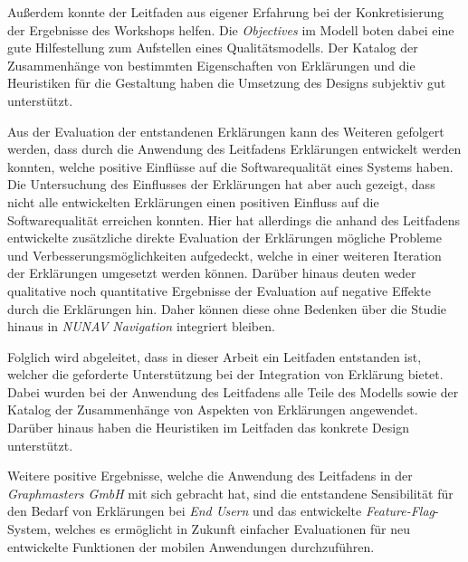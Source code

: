 Außerdem konnte der Leitfaden aus eigener Erfahrung bei der Konkretisierung der Ergebnisse des Workshops helfen. Die \textit{Objectives} im Modell boten dabei eine gute Hilfestellung zum Aufstellen eines Qualitätsmodells. Der Katalog der Zusammenhänge von bestimmten Eigenschaften von Erklärungen und die Heuristiken für die Gestaltung haben die Umsetzung des Designs subjektiv gut unterstützt.

Aus der Evaluation der entstandenen Erklärungen kann des Weiteren gefolgert werden, dass durch die Anwendung des Leitfadens Erklärungen entwickelt werden konnten, welche positive Einflüsse auf die Softwarequalität eines Systems haben. Die Untersuchung des Einflusses der Erklärungen hat aber auch gezeigt, dass nicht alle entwickelten Erklärungen einen positiven Einfluss auf die Softwarequalität erreichen konnten. Hier hat allerdings die anhand des Leitfadens entwickelte zusätzliche direkte Evaluation der Erklärungen mögliche Probleme und Verbesserungsmöglichkeiten aufgedeckt, welche in einer weiteren Iteration der Erklärungen umgesetzt werden können. Darüber hinaus deuten weder qualitative noch quantitative Ergebnisse der Evaluation auf negative Effekte durch die Erklärungen hin. Daher können diese ohne Bedenken über die Studie hinaus in \textit{NUNAV Navigation} integriert bleiben.

Folglich wird abgeleitet, dass in dieser Arbeit ein Leitfaden entstanden ist, welcher die geforderte Unterstützung bei der Integration von Erklärung bietet. Dabei wurden bei der Anwendung des Leitfadens alle Teile des Modells sowie der Katalog der Zusammenhänge von Aspekten von Erklärungen angewendet. Darüber hinaus haben die Heuristiken im Leitfaden das konkrete Design unterstützt.

Weitere positive Ergebnisse, welche die Anwendung des Leitfadens in der \textit{Graphmasters GmbH} mit sich gebracht hat, sind die entstandene Sensibilität für den Bedarf von Erklärungen bei \textit{End Usern} und das entwickelte \textit{Feature-Flag}-System, welches es ermöglicht in Zukunft einfacher Evaluationen für neu entwickelte Funktionen der mobilen Anwendungen durchzuführen.